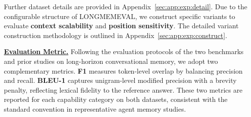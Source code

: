 
\noindent Further dataset details are provided in Appendix~\ref{sec:app:exp:detail}. Due to the configurable structure of LONGMEMEVAL, we construct specific variants to evaluate \textbf{context scalability} and \textbf{position sensitivity}. The detailed variant construction methodology is outlined in Appendix~\ref{sec:app:exp:construct}.




\noindent {} \textbf{\underline{Evaluation Metric.}} 
Following the evaluation protocols of the two benchmarks and prior studies on long-horizon conversational memory, we adopt two complementary metrics.
\textbf{F1} measures token-level overlap by balancing precision and recall.
\textbf{BLEU-1} captures unigram-level modified precision with a brevity penalty, reflecting lexical fidelity to the reference answer.
These two metrics are reported for each capability category on both datasets, consistent with the standard convention in representative agent memory studies.



